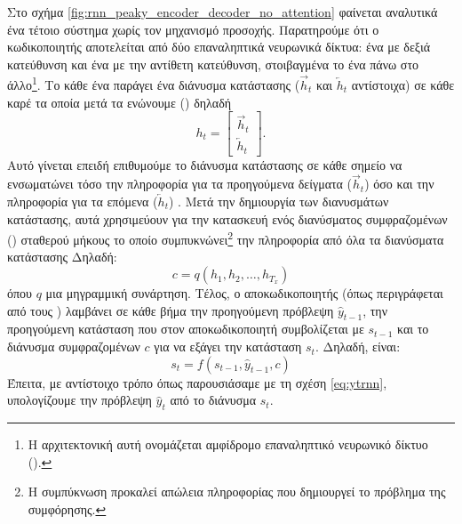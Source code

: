 Στο σχήμα \ref{fig:rnn_peaky_encoder_decoder_no_attention} φαίνεται αναλυτικά ένα τέτοιο σύστημα χωρίς τον μηχανισμό προσοχής. Παρατηρούμε ότι ο κωδικοποιητής αποτελείται από δύο επαναληπτικά νευρωνικά δίκτυα: ένα με δεξιά κατεύθυνση και ένα με την αντίθετη κατεύθυνση, στοιβαγμένα το ένα πάνω στο άλλο\footnote{Η αρχιτεκτονική αυτή ονομάζεται αμφίδρομο επαναληπτικό νευρωνικό δίκτυο ().}\cite{schuster1997bidirectional}. Το κάθε ένα παράγει ένα διάνυσμα κατάστασης ($\overrightarrow{h}_t$ και $\overleftarrow{h}_t$ αντίστοιχα) σε κάθε καρέ τα οποία μετά τα ενώνουμε () δηλαδή 
\[h_t = 
  \begin{bmatrix}
    \overrightarrow{h}_t\\
    \overleftarrow{h}_t
  \end{bmatrix}
.\]
Αυτό γίνεται επειδή επιθυμούμε το διάνυσμα κατάστασης σε κάθε σημείο να ενσωματώνει τόσο την πληροφορία για τα προηγούμενα δείγματα ($\overrightarrow{h}_t$) όσο και την πληροφορία για τα επόμενα ($\overleftarrow{h}_t$) \cite{bahdanau2014neural_machine_translation_attention_begins}. Μετά την δημιουργία των διανυσμάτων κατάστασης, αυτά χρησιμεύουν για την κατασκευή ενός διανύσματος συμφραζομένων () σταθερού μήκους το οποίο συμπυκνώνει\footnote{Η συμπύκνωση προκαλεί απώλεια  πληροφορίας που δημιουργεί το πρόβλημα της συμφόρησης.} την πληροφορία από όλα τα διανύσματα κατάστασης Δηλαδή:
\[
  c = q({h_1, h_2, \dots, h_{T_x}})
\]
όπου $q$ μια μη\textendash γραμμική συνάρτηση. Τέλος, ο αποκωδικοποιητής (όπως περιγράφεται από τους  \cite{bahdanau2014neural_machine_translation_attention_begins}) λαμβάνει σε κάθε βήμα την προηγούμενη πρόβλεψη $\hat{y}_{t-1}$, την προηγούμενη κατάσταση που στον αποκωδικοποιητή συμβολίζεται με $s_{t-1}$ και το διάνυσμα συμφραζομένων $c$ για να εξάγει την κατάσταση $s_t$. Δηλαδή, είναι:
\[
  s_t = f(s_{t-1}, \hat{y}_{t-1}, c)
\]
Έπειτα, με αντίστοιχο τρόπο όπως παρουσιάσαμε με τη σχέση \ref{eq:ytrnn}, υπολογίζουμε την πρόβλεψη $\hat{y}_t$ από το διάνυσμα $s_t$.\par

